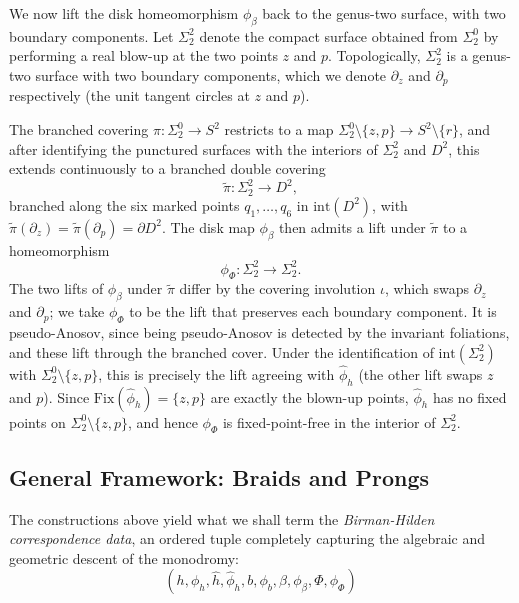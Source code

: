 We now lift the disk homeomorphism $\phi_\beta$ back to the genus-two surface, with two boundary components. Let $\Sigma_2^2$ denote the compact surface obtained from $\Sigma_2^0$ by performing a real blow-up at the two points $z$ and $p$. Topologically, $\Sigma_2^2$ is a genus-two surface with two boundary components, which we denote $\partial_z$ and $\partial_p$ respectively (the unit tangent circles at $z$ and $p$).

The branched covering $\pi \colon \Sigma_2^0 \to S^2$ restricts to a map $\Sigma_2^0 \setminus \{z, p\} \to S^2 \setminus \{r\}$, and after identifying the punctured surfaces with the interiors of $\Sigma_2^2$ and $D^2$, this extends continuously to a branched double covering
\[
\tilde\pi \colon \Sigma_2^2 \to D^2,
\]
branched along the six marked points $q_1, \ldots, q_6$ in $\mathrm{int}(D^2)$, with $\tilde\pi(\partial_z) = \tilde\pi(\partial_p) = \partial D^2$. The disk map $\phi_\beta$ then admits a lift under $\tilde\pi$ to a homeomorphism
\[
\phi_\Phi \colon \Sigma_2^2 \to \Sigma_2^2.
\]
The two lifts of $\phi_\beta$ under $\tilde\pi$ differ by the covering involution $\iota$, which swaps $\partial_z$ and $\partial_p$; we take $\phi_\Phi$ to be the lift that preserves each boundary component. It is pseudo-Anosov, since being pseudo-Anosov is detected by the invariant foliations, and these lift through the branched cover. Under the identification of $\mathrm{int}(\Sigma_2^2)$ with $\Sigma_2^0 \setminus \{z, p\}$, this is precisely the lift agreeing with $\hat{\phi}_h$ (the other lift swaps $z$ and $p$). Since $\mathrm{Fix}(\hat{\phi}_h) = \{z, p\}$ are exactly the blown-up points, $\hat{\phi}_h$ has no fixed points on $\Sigma_2^0 \setminus \{z, p\}$, and hence $\phi_\Phi$ is fixed-point-free in the interior of $\Sigma_2^2$.

\subsection{General Framework: Braids and Prongs}

The constructions above yield what we shall term the \emph{Birman-Hilden correspondence data}, an ordered tuple completely capturing the algebraic and geometric descent of the monodromy:
\[
(h, \phi_h, \hat{h}, \hat{\phi}_h, b, \phi_b, \beta, \phi_\beta, \Phi, \phi_\Phi)
\]

